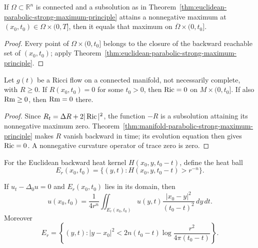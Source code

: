 \begin{corollary}
\label{cor:cylindrical-parabolic-strong-maximum-principle}
If $\Omega\subset\mathbb R^n$ is connected and a subsolution as in
Theorem~\ref{thm:euclidean-parabolic-strong-maximum-principle} attains a
nonnegative maximum at $(x_0,t_0)\in\Omega\times(0,T]$, then it equals that
maximum on $\overline\Omega\times(0,t_0]$.
\end{corollary}

\begin{proof}
Every point of $\Omega\times(0,t_0]$ belongs to the closure of the backward
reachable set of $(x_0,t_0)$; apply
Theorem~\ref{thm:euclidean-parabolic-strong-maximum-principle}.
\end{proof}

\begin{corollary}
\label{cor:ricci-flow-scalar-curvature-strong-maximum-principle}
Let $g(t)$ be a Ricci flow on a connected manifold, not necessarily complete,
with $R\geq0$.  If $R(x_0,t_0)=0$ for some $t_0>0$, then
$\operatorname{Ric}=0$ on $M\times(0,t_0]$.  If also $\operatorname{Rm}\geq0$, then $\operatorname{Rm}=0$ there.
\end{corollary}

\begin{proof}
Since $R_t=\Delta R+2|\operatorname{Ric}|^2$, the function $-R$ is a subsolution attaining
its nonnegative maximum zero.  Theorem~\ref{thm:manifold-parabolic-strong-maximum-principle}
makes $R$ vanish backward in time; its evolution equation then gives
$\operatorname{Ric}=0$.  A nonnegative curvature operator of trace zero is zero.
\end{proof}

For the Euclidean backward heat kernel $H(x_0,y,t_0-t)$, define the heat ball
\[
E_r(x_0,t_0)=\{(y,t):H(x_0,y,t_0-t)>r^{-n}\}.
\]

\begin{corollary}
\label{cor:euclidean-heat-mean-value-property}
If $u_t-\Delta_0u=0$ and $E_r(x_0,t_0)$ lies in its domain, then
\[
u(x_0,t_0)=\frac1{4r^n}\iint_{E_r(x_0,t_0)}
u(y,t)\frac{|x_0-y|^2}{(t_0-t)^2}\,dy\,dt.
\]
Moreover
\[
E_r=\left\{(y,t):|y-x_0|^2<2n(t_0-t)
\log\frac{r^2}{4\pi(t_0-t)}\right\}.
\]
\end{corollary}

